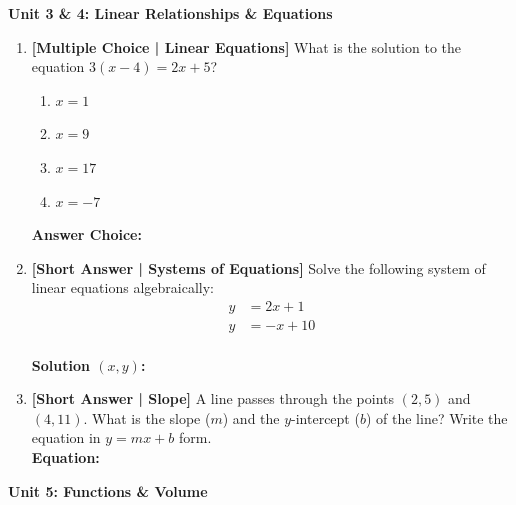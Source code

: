 \documentclass[12pt, letterpaper, fleqn]{article}
\newcommand{\blankshorter}{\underline{\hspace{2.0cm}}}
\newcommand{\blanklong}{\underline{\hspace{6.5cm}}}
\begin{document}
\begin{tcolorbox}[colback=white, colframe=black, arc=2mm]
    \textbf{Unit 3 \& 4: Linear Relationships \& Equations}
\end{tcolorbox}

\begin{enumerate}[leftmargin=0.6cm, itemsep=\fill, start=4]

\item \textbf{[Multiple Choice | Linear Equations]} What is the solution to the equation $3(x - 4) = 2x + 5$?
\begin{enumerate}[label=\Alph*)]
    \item $x = 1$
    \item $x = 9$
    \item $x = 17$
    \item $x = -7$
\end{enumerate}
\textbf{Answer Choice:} \blankshorter

\item \textbf{[Short Answer | Systems of Equations]} Solve the following system of linear equations algebraically:
\begin{align*}
y &= 2x + 1 \\
y &= -x + 10
\end{align*}
\vspace{2.5cm} \\
\textbf{Solution $(x, y)$:} \blanklong

\item \textbf{[Short Answer | Slope]} A line passes through the points $(2, 5)$ and $(4, 11)$. What is the slope ($m$) and the $y$-intercept ($b$) of the line? Write the equation in $y = mx + b$ form.
\vspace{2.5cm} \\
\textbf{Equation:} \blanklong

\end{enumerate}

\vspace{0.5cm}

\begin{tcolorbox}[colback=white, colframe=black, arc=2mm]
    \textbf{Unit 5: Functions \& Volume}
\end{tcolorbox}
\end{document}
